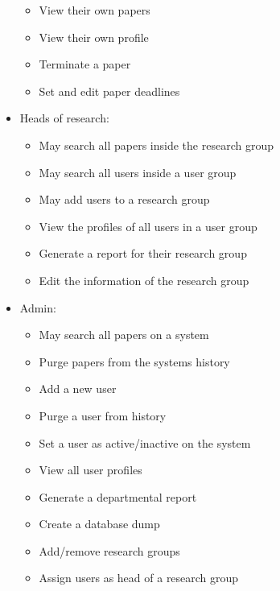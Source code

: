 \documentclass[a4paper]{article}
\begin{document}
\begin{itemize}
\begin{itemize}
			\item View their own papers
            \item View their own profile
            \item Terminate a paper
            \item Set and edit paper deadlines
		\end{itemize}
         \item Heads of research:
		\begin{itemize}
			\item May search all papers inside the research group
			\item May search all users inside a user group
			\item May add users to a research group
			\item View the profiles of all users in a user group
            \item Generate a report for their research group
            \item Edit the information of the research group
		\end{itemize}
         \item Admin:
		\begin{itemize}
			\item May search all papers on a system
			\item Purge papers from the systems history
			\item Add a new user
			\item Purge a user from history
            \item Set a user as active/inactive on the system
            \item View all user profiles
            \item Generate a departmental report
            \item Create a database dump
            \item Add/remove research groups
            \item Assign users as head of a research group
		\end{itemize}
	\end{itemize}
    
\end{document}
